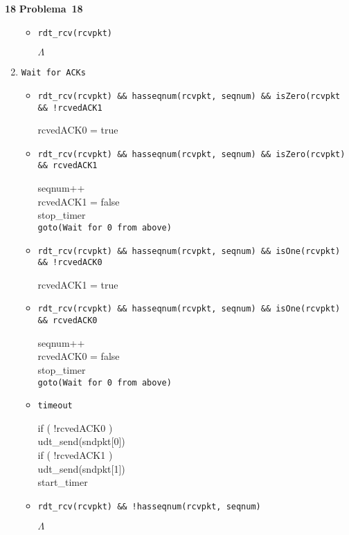 \documentclass{article}
\newcounter{exe-list}
\newenvironment{exe}[2][Problema]
    {\newcommand{\opt}{(Opcional)}%
    \newcommand{\sketch}[1]{{\bfseries Rascunho:} ##1}%
    \medskip\par\noindent\ifthenelse{\equal{#1}{}}
        {\textbf{\large #2}}
        {\textbf{\large #1~#2}}%
    \medskip\par\noindent}
    {\medskip}
\newcommand{\tab}[1]{\phantom{\hspace{#1}}}
\begin{document}
\begin{exe}{18}
\begin{enumerate}
\begin{itemize}
                \item \texttt{rdt\_rcv(rcvpkt)} \par
                    \(\Lambda\)
            \end{itemize}
        \item \texttt{Wait for ACKs} \par
            \begin{itemize}
                \item \texttt{rdt\_rcv(rcvpkt)
                        \&\& hasseqnum(rcvpkt, seqnum)
                        \&\& isZero(rcvpkt \\\tab{4ex}
                        \&\& !rcvedACK1} \par
                    rcvedACK0 = true
                \item \texttt{rdt\_rcv(rcvpkt)
                        \&\& hasseqnum(rcvpkt, seqnum)
                        \&\& isZero(rcvpkt) \\\tab{4ex}
                        \&\& rcvedACK1} \par
                    seqnum++ \\
                    rcvedACK1 = false \\
                    stop\_timer \\
                    \texttt{goto(Wait for 0 from above)}
                \item \texttt{rdt\_rcv(rcvpkt)
                        \&\& hasseqnum(rcvpkt, seqnum)
                        \&\& isOne(rcvpkt) \\\tab{4ex}
                        \&\& !rcvedACK0} \par
                    rcvedACK1 = true
                \item \texttt{rdt\_rcv(rcvpkt)
                        \&\& hasseqnum(rcvpkt, seqnum)
                        \&\& isOne(rcvpkt) \\\tab{4ex}
                        \&\& rcvedACK0} \par
                    seqnum++ \\
                    rcvedACK0 = false \\
                    stop\_timer \\
                    \texttt{goto(Wait for 0 from above)}
                \item \texttt{timeout} \par
                    if ( !rcvedACK0 ) \\\tab{2ex}
                        udt\_send(sndpkt[0]) \\
                    if ( !rcvedACK1 ) \\\tab{2ex}
                        udt\_send(sndpkt[1]) \\
                    start\_timer
                \item \texttt{rdt\_rcv(rcvpkt)
                        \&\& !hasseqnum(rcvpkt, seqnum)} \par
                    \(\Lambda\)
            \end{itemize}
    \end{enumerate}


\end{exe}
\end{document}
